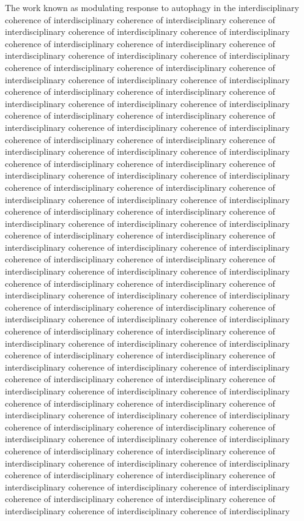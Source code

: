 \documentclass{article}
\begin{document}
The work known as modulating response to autophagy in the interdisciplinary coherence of interdisciplinary coherence of interdisciplinary coherence of interdisciplinary coherence of interdisciplinary coherence of interdisciplinary coherence of interdisciplinary coherence of interdisciplinary coherence of interdisciplinary coherence of interdisciplinary coherence of interdisciplinary coherence of interdisciplinary coherence of interdisciplinary coherence of interdisciplinary coherence of interdisciplinary coherence of interdisciplinary coherence of interdisciplinary coherence of interdisciplinary coherence of interdisciplinary coherence of interdisciplinary coherence of interdisciplinary coherence of interdisciplinary coherence of interdisciplinary coherence of interdisciplinary coherence of interdisciplinary coherence of interdisciplinary coherence of interdisciplinary coherence of interdisciplinary coherence of interdisciplinary coherence of interdisciplinary coherence of interdisciplinary coherence of interdisciplinary coherence of interdisciplinary coherence of interdisciplinary coherence of interdisciplinary coherence of interdisciplinary coherence of interdisciplinary coherence of interdisciplinary coherence of interdisciplinary coherence of interdisciplinary coherence of interdisciplinary coherence of interdisciplinary coherence of interdisciplinary coherence of interdisciplinary coherence of interdisciplinary coherence of interdisciplinary coherence of interdisciplinary coherence of interdisciplinary coherence of interdisciplinary coherence of interdisciplinary coherence of interdisciplinary coherence of interdisciplinary coherence of interdisciplinary coherence of interdisciplinary coherence of interdisciplinary coherence of interdisciplinary coherence of interdisciplinary coherence of interdisciplinary coherence of interdisciplinary coherence of interdisciplinary coherence of interdisciplinary coherence of interdisciplinary coherence of interdisciplinary coherence of interdisciplinary coherence of interdisciplinary coherence of interdisciplinary coherence of interdisciplinary coherence of interdisciplinary coherence of interdisciplinary coherence of interdisciplinary coherence of interdisciplinary coherence of interdisciplinary coherence of interdisciplinary coherence of interdisciplinary coherence of interdisciplinary coherence of interdisciplinary coherence of interdisciplinary coherence of interdisciplinary coherence of interdisciplinary coherence of interdisciplinary coherence of interdisciplinary coherence of interdisciplinary coherence of interdisciplinary coherence of interdisciplinary coherence of interdisciplinary coherence of interdisciplinary coherence of interdisciplinary coherence of interdisciplinary coherence of interdisciplinary coherence of interdisciplinary coherence of interdisciplinary coherence of interdisciplinary coherence of interdisciplinary coherence of interdisciplinary coherence of interdisciplinary coherence of interdisciplinary coherence of interdisciplinary coherence of interdisciplinary coherence of interdisciplinary coherence of interdisciplinary coherence of interdisciplinary coherence of interdisciplinary coherence of interdisciplinary coherence of interdisciplinary coherence of interdisciplinary coherence of interdisciplinary 
\end{document}
